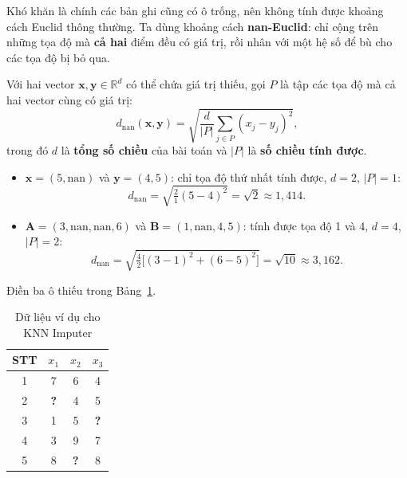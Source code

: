 Khó khăn là chính các bản ghi cũng có ô trống, nên không tính được khoảng cách Euclid thông thường. Ta dùng khoảng cách \textbf{nan-Euclid}: chỉ cộng trên những tọa độ mà \textbf{cả hai} điểm đều có giá trị, rồi nhân với một hệ số để bù cho các tọa độ bị bỏ qua.

\begin{definition}
Với hai vector $\mathbf{x}, \mathbf{y} \in \mathbb{R}^d$ có thể chứa giá trị thiếu, gọi $P$ là tập các tọa độ mà cả hai vector cùng có giá trị:
\begin{equation}
    d_{\text{nan}}(\mathbf{x}, \mathbf{y}) = \sqrt{\frac{d}{|P|} \sum_{j \in P} (x_j - y_j)^2},
\end{equation}
trong đó $d$ là \textbf{tổng số chiều} của bài toán và $|P|$ là \textbf{số chiều tính được}.
\end{definition}

\begin{example}
\begin{itemize}
    \item $\mathbf{x} = (5, \text{nan})$ và $\mathbf{y} = (4, 5)$: chỉ tọa độ thứ nhất tính được, $d = 2$, $|P| = 1$:
    \[ d_{\text{nan}} = \sqrt{\tfrac{2}{1}(5 - 4)^2} = \sqrt{2} \approx 1{,}414. \]
    \item $\mathbf{A} = (3, \text{nan}, \text{nan}, 6)$ và $\mathbf{B} = (1, \text{nan}, 4, 5)$: tính được tọa độ 1 và 4, $d = 4$, $|P| = 2$:
    \[ d_{\text{nan}} = \sqrt{\tfrac{4}{2}\big[(3 - 1)^2 + (6 - 5)^2\big]} = \sqrt{10} \approx 3{,}162. \]
\end{itemize}
\end{example}

\begin{example}[Chạy tay KNN Imputer với $k = 3$]
Điền ba ô thiếu trong Bảng~\ref{tab:knn-impute}.
\end{example}

\begin{table}[H]
\centering
\begin{tabular}{|c|c|c|c|}
\hline
\textbf{STT} & $x_1$ & $x_2$ & $x_3$ \\
\hline
1 & 7 & 6 & 4 \\ \hline
2 & \textbf{?} & 4 & 5 \\ \hline
3 & 1 & 5 & \textbf{?} \\ \hline
4 & 3 & 9 & 7 \\ \hline
5 & 8 & \textbf{?} & 8 \\ \hline
\end{tabular}
\caption{Dữ liệu ví dụ cho KNN Imputer}
\label{tab:knn-impute}
\end{table}

